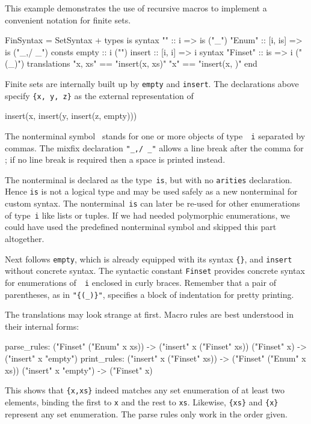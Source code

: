 This example demonstrates the use of recursive macros to implement a
convenient notation for finite sets.
\begin{ttbox}
FinSyntax = SetSyntax +
types
  is
syntax
  ""            :: i => is                  ("_")
  "{\at}Enum"       :: [i, is] => is            ("_,/ _")
consts
  empty         :: i                        ("{\ttlbrace}{\ttrbrace}")
  insert        :: [i, i] => i
syntax
  "{\at}Finset"     :: is => i                  ("{\ttlbrace}(_){\ttrbrace}")
translations
  "{\ttlbrace}x, xs{\ttrbrace}"     == "insert(x, {\ttlbrace}xs{\ttrbrace})"
  "{\ttlbrace}x{\ttrbrace}"         == "insert(x, {\ttlbrace}{\ttrbrace})"
end
\end{ttbox}
Finite sets are internally built up by {\tt empty} and {\tt insert}.  The
declarations above specify \verb|{x, y, z}| as the external representation
of
\begin{ttbox}
insert(x, insert(y, insert(z, empty)))
\end{ttbox}
The nonterminal symbol~ stands for one or more objects of type~{\tt
  i} separated by commas.  The mixfix declaration \hbox{\verb|"_,/ _"|}
allows a line break after the comma for ; if no
line break is required then a space is printed instead.

The nonterminal is declared as the type~{\tt is}, but with no {\tt arities}
declaration.  Hence {\tt is} is not a logical type and may be used safely as
a new nonterminal for custom syntax.  The nonterminal~{\tt is} can later be
re-used for other enumerations of type~{\tt i} like lists or tuples.  If we
had needed polymorphic enumerations, we could have used the predefined
nonterminal symbol  and skipped this part altogether.

Next follows {\tt empty}, which is already equipped with its syntax
\verb|{}|, and {\tt insert} without concrete syntax.  The syntactic
constant {\tt\at Finset} provides concrete syntax for enumerations of~{\tt
  i} enclosed in curly braces.  Remember that a pair of parentheses, as in
\verb|"{(_)}"|, specifies a block of indentation for pretty printing.

The translations may look strange at first.  Macro rules are best
understood in their internal forms:
\begin{ttbox}
parse_rules:
  ("{\at}Finset" ("{\at}Enum" x xs))  ->  ("insert" x ("{\at}Finset" xs))
  ("{\at}Finset" x)  ->  ("insert" x "empty")
print_rules:
  ("insert" x ("{\at}Finset" xs))  ->  ("{\at}Finset" ("{\at}Enum" x xs))
  ("insert" x "empty")  ->  ("{\at}Finset" x)
\end{ttbox}
This shows that \verb|{x,xs}| indeed matches any set enumeration of at least
two elements, binding the first to {\tt x} and the rest to {\tt xs}.
Likewise, \verb|{xs}| and \verb|{x}| represent any set enumeration.
The parse rules only work in the order given.


